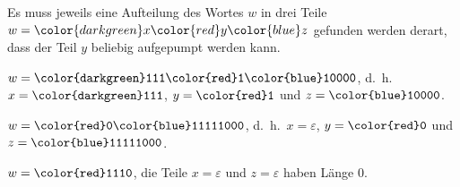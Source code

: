 
\begin{loesung}
Es muss jeweils eine Aufteilung des Wortes $w$ in drei Teile
$w={\color{darkgreen}x}{\color{red}y}{\color{blue}z}$ gefunden
werden derart, dass der Teil $y$ beliebig aufgepumpt werden kann.
\begin{teilaufgaben}
\item
$w=\texttt{{\color{darkgreen}111}{\color{red}1}{\color{blue}10000}}$,
d.~h.~$x=\texttt{\color{darkgreen}111}$, $y=\texttt{\color{red}1}$
und $z=\texttt{\color{blue}10000}$.
\item
$w=\texttt{{\color{red}0}{\color{blue}11111000}}$,
d.~h.~$x=\varepsilon$, $y=\texttt{\color{red}0}$ und
$z=\texttt{\color{blue}11111000}$.
\item
$w=\texttt{\color{red}1110}$, die Teile $x=\varepsilon$ und $z=\varepsilon$
haben Länge $0$.
\qedhere
\end{teilaufgaben}
\end{loesung}

